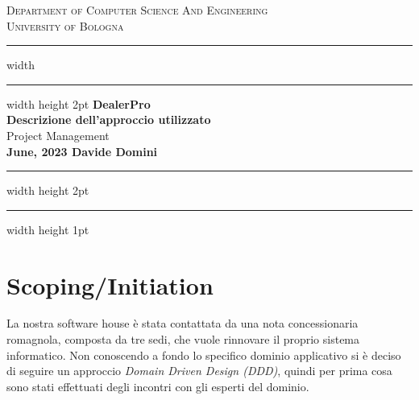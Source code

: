 \documentclass{article}
\begin{document}
\begin{titlepage}

  \newcommand{\HRule}{\rule{\linewidth}{0.5mm}}
  \center
  
  \textsc{\Large Department of Computer Science And Engineering}\\[0.5cm]
  
  \textsc{\Large University of Bologna}\\[0.6cm]
  
  \hrule width \hsize \kern 1mm \hrule width \hsize height 2pt 
  \vspace{0.8cm}
  { \large \bfseries DealerPro}\\[0.6cm]
  { \large \bfseries Descrizione dell'approccio utilizzato}\\[0.6cm]
  { \large Project Management}\\[0.6cm]
  
  
  {\bfseries{June, 2023}
  \hfill
  \bfseries{Davide Domini}}\\[0.6cm]
  
  \hrule width \hsize height 2pt \kern 1mm \hrule width \hsize height 1pt
  \vspace{0.4cm}
  
  \end{titlepage}
  \clearpage

  \tableofcontents

  \newpage
  \section{Scoping/Initiation}

  La nostra software house è stata contattata da una nota concessionaria romagnola, composta da tre sedi, 
    che vuole rinnovare il proprio sistema informatico. Non conoscendo a fondo lo specifico dominio applicativo
    si è deciso di seguire un approccio \emph{Domain Driven Design (DDD)}, quindi per prima cosa sono stati effettuati
    degli incontri con gli esperti del dominio.
\end{document}
